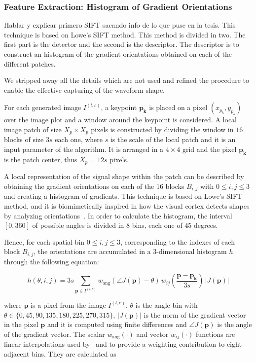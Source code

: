 \documentclass[utf8]{frontiersSCNS} %
\begin{document}
\subsubsection{Feature Extraction: Histogram of Gradient Orientations}
\label{SIFT}

Hablar y explicar primero SIFT sacando info de lo que puse en la tesis.
This technique is based on Lowe's SIFT method.  This method is divided in two.  The first part is the detector and the second is the descriptor.  The descriptor is to construct an histogram of the gradient orientations obtained on each of the different patches.

We stripped away all the details which are not used and refined the procedure to enable the effective capturing of the waveform shape.


For each generated image $I^{(l,c)}$, a keypoint $\mathbf{p_k}$ is placed on a pixel $(x_{p_k}, y_{p_k})$ over the image plot and a window around the keypoint is considered. A local image patch of size $X_p \times X_p$ pixels is constructed by dividing the window in $16$ blocks of size $3s$ each one,  where $s$ is the scale of the local patch and it is an input parameter of the algorithm. It is arranged in a $4 \times 4$ grid and the pixel $ \mathbf{p_k}$ is the patch center, thus $X_p = 12s $ pixels. 

A local representation of the signal shape within the patch can be described by obtaining the gradient orientations on each of the $16$ blocks $B_{i,j}$  with $ 0 \leq i,j \leq 3$ and creating a histogram of gradients.  This technique is based on Lowe's SIFT~\citep{Lowe2004} method, and it is biomimetically inspired in how the visual cortex detects shapes by analyzing orientations~\citep{cogprints561}.   In order to calculate the histogram, the interval $[0,360]$ of possible angles is divided in $8$ bins, each one of $45$ degrees.

 Hence, for each spatial bin $ 0 \leq i,j \leq 3$, corresponding to the indexes of each block $B_{i,j}$,  the orientations are accumulated in a  $3$-dimensional histogram $h$ through the following equation: 
 

\begin{equation}
 h(\theta,i,j) = 3 s \sum_{\mathbf{p} \in I^{(l,c)}} w_\mathrm{ang}(\angle J(\mathbf{p}) - \theta)\, w_{ij}\left(\frac{\mathbf{p} - \mathbf{p_k}}{3 s}\right)\, |J(\mathbf{p})|
\label{eq:histogram}
\end{equation}

\noindent  where $\mathbf{p}$ is a pixel from the image $I^{(l,c)}$,  $\theta$ is the angle bin with $ \theta \in \{0, 45, 90, 135, 180, 225, 270, 315\} $,  $ |J(\mathbf{p})| $ is the norm of the gradient vector in the pixel $\mathbf{p}$ and it is computed using finite differences and $\angle J(\mathbf{p}) $ is the angle of the gradient vector.  The scalar $ w_\mathrm{ang}(\cdot) $  and vector $ w_{ij}(\cdot) $ functions are linear interpolations used by~\cite{Lowe2004} and \cite{Vedaldi2010} to provide a weighting contribution to eight adjacent bins.  They are calculated as  
\end{document}
